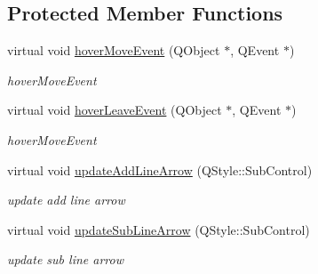 \subsection*{Protected Member Functions}
\begin{DoxyCompactItemize}
\item 
\mbox{\label{class_scroll_bar_data_a0b7c702341be662a4cff6940f5c44300}} 
virtual void \hyperlink{class_scroll_bar_data_a0b7c702341be662a4cff6940f5c44300}{hover\+Move\+Event} (Q\+Object $\ast$, Q\+Event $\ast$)
\begin{DoxyCompactList}\small\item\em hover\+Move\+Event \end{DoxyCompactList}\item 
\mbox{\label{class_scroll_bar_data_abccd522a69c7893ceb3aa494c8aabaa7}} 
virtual void \hyperlink{class_scroll_bar_data_abccd522a69c7893ceb3aa494c8aabaa7}{hover\+Leave\+Event} (Q\+Object $\ast$, Q\+Event $\ast$)
\begin{DoxyCompactList}\small\item\em hover\+Move\+Event \end{DoxyCompactList}\item 
\mbox{\label{class_scroll_bar_data_ae0dea714e68aadff8cd282fa48f0948d}} 
virtual void \hyperlink{class_scroll_bar_data_ae0dea714e68aadff8cd282fa48f0948d}{update\+Add\+Line\+Arrow} (Q\+Style\+::\+Sub\+Control)
\begin{DoxyCompactList}\small\item\em update add line arrow \end{DoxyCompactList}\item 
\mbox{\label{class_scroll_bar_data_a2cffbd892e2e1256c821a9c6da7cc92a}} 
virtual void \hyperlink{class_scroll_bar_data_a2cffbd892e2e1256c821a9c6da7cc92a}{update\+Sub\+Line\+Arrow} (Q\+Style\+::\+Sub\+Control)
\begin{DoxyCompactList}\small\item\em update sub line arrow \end{DoxyCompactList}\end{DoxyCompactItemize}
